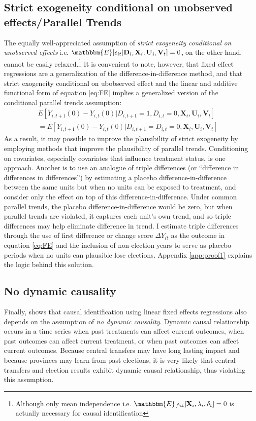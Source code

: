 \documentclass[12pt]{article}\usepackage[]{graphicx}\usepackage[]{color}
\newcommand{\1}{\mathbbm{1}}
\newcommand\E{\mathbbm{E}}
\begin{document}
\subsection{Strict exogeneity conditional on unobserved effects/Parallel Trends}
The equally well-appreciated assumption of \textit{strict exogeneity conditional on unobserved effects} i.e. $\E[\epsilon_{it} | \mathbf{D}_i, \mathbf{X}_i, \mathbf{U}_i, \mathbf{V}_t ] = 0$, on the other hand, cannot be easily relaxed.\footnote{Although only mean independence i.e. $\E[\epsilon_{it} | \mathbf{X}_i, \lambda_i, \delta_t] = 0$ is actually necessary for causal identification} It is convenient to note, however, that fixed effect regressions are a generalization of the difference-in-difference method, and that strict exogeneity conditional on ubobserved effect and the linear and additive functional form of equation \ref{eq:FE} implies a generalized version of the conditional parallel trends assumption:
\begin{align*}
	E[Y_{i,t+1}(0) - Y_{i,t}(0) | D_{i,t+1} = 1, D_{i,t} = 0, \mathbf{X}_i, \mathbf{U}_i, \mathbf{V}_t] \\
	= E[Y_{i,t+1}(0) - Y_{i,t}(0) |  D_{i,t+1} = D_{i,t} = 0, \mathbf{X}_i, \mathbf{U}_i, \mathbf{V}_t]
\end{align*} 
As a result, it may possible to improve the plausibility of strict exogeneity by employing methods that improve the plausibility of parallel trends. Conditioning on covariates, especially covariates that influence treatment status, is one approach. Another is to use an analogue of triple differences (or ``difference in differences in differences'') by estimating a placebo difference-in-difference between the same units but when no units can be exposed to treatment, and consider only the effect on top of this difference-in-difference. Under common parallel trends, the placebo difference-in-difference would be zero, but when parallel trends are violated, it captures each unit's own trend, and so triple differences may help eliminate difference in trend. I estimate triple differences through the use of first difference or change score $\Delta Y_{it}$ as the outcome in equation \ref{eq:FE} and the inclusion of non-election years to serve as placebo periods when no units can plausible lose elections. Appendix \ref{app:proof1} explains the logic behind this solution.

\subsection{No dynamic causality}
Finally, \citep{ImaiKim2012} shows that causal identification using linear fixed effects regressions also depends on the assumption of \textit{no dynamic causality}. Dynamic causal relationship occurs in a time series when past treatments can affect current outcomes, when past outcomes can affect current treatment, or when past outcomes can affect current outcomes. Because central transfers may have long lasting impact and because provinces may learn from past elections, it is very likely that central transfers and election results exhibit dynamic causal relationship, thus violating this assumption.
\end{document}
